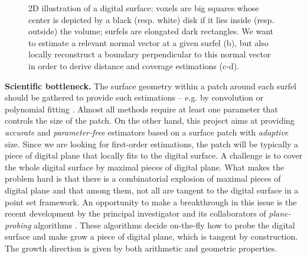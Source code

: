 \begin{figure}[hb]
  \centering
{} \hspace{0.05\textwidth}
 \hspace{0.05\textwidth}
 \hspace{0.05\textwidth}
 \caption{2D illustration of a digital surface: voxels are big squares whose center is depicted by a black (resp. white) disk if it lies inside (resp. outside) the volume; surfels are elongated dark rectangles. We want to estimate a relevant normal vector at a given surfel (b), but also locally reconstruct a boundary perpendicular to this normal vector in order to derive distance and coverage estimations (c-d).} 
\label{fig:2D} 
\end{figure}

\noindent\textbf{Scientific bottleneck.}
The surface geometry within a patch around each surfel should be gathered to provide such estimations
-- e.g. by convolution \cite{Pottmann2009} or polynomial fitting \cite{Cazals2008}.
Almost all methods require at least one parameter that controls the size of the patch.  
On the other hand, this project aims at providing \emph{accurate} and \emph{parameter-free} estimators
based on a surface patch with \emph{adaptive} size.
Since we are looking for first-order estimations, the patch will be typically a piece of digital plane
that locally fits to the digital surface. %
A challenge is to cover the whole digital surface by maximal pieces of digital plane. 
What makes the problem hard is that there is a combinatorial explosion
of maximal pieces of digital plane \cite{Sivignon2009} and that among them,
not all are tangent to the digital surface in a point set framework.  
An opportunity to make a breakthrough in this issue is the recent development
by the principal investigator and its collaborators of \emph{plane-probing}
algorithms \cite{LPRTCS2016, LPRDGCI2016, LPRJMIV2017}. These algorithms decide
on-the-fly how to probe the digital surface and make grow a piece of digital plane,
which is tangent by construction. The growth direction is given by both arithmetic and geometric properties.


